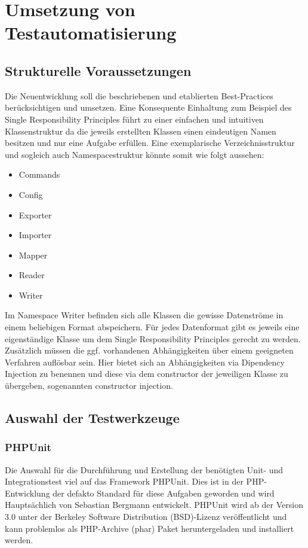 \newpage
\section{Umsetzung von Testautomatisierung}

\subsection{Strukturelle Voraussetzungen}
Die Neuentwicklung soll die beschriebenen und etablierten Best-Practices berücksichtigen und umsetzen. Eine Konsequente Einhaltung zum Beispiel des Single Responsibility Principles führt zu einer einfachen und intuitiven Klassenstruktur da die jeweils erstellten Klassen einen eindeutigen Namen besitzen und nur eine Aufgabe erfüllen. Eine exemplarische Verzeichnisstruktur und sogleich auch Namespacestruktur könnte somit wie folgt aussehen: 

\begin{itemize}
	\item Commands
	\item Config
	\item Exporter
	\item Importer
	\item Mapper
	\item Reader
	\item Writer
\end{itemize}

Im Namespace Writer befinden sich alle Klassen die gewisse Datenströme in einem beliebigen Format abspeichern. Für jedes Datenformat gibt es jeweils eine eigenständige Klasse um dem Single Responsibility Principles gerecht zu werden. Zusätzlich müssen die ggf. vorhandenen Abhängigkeiten über einem geeigneten Verfahren auflösbar sein. Hier bietet sich an Abhängigkeiten via Dipendency Injection zu benennen und diese via dem constructor der jeweiligen Klasse zu übergeben, sogenannten constructor injection.

\subsection{Auswahl der Testwerkzeuge}
\subsubsection{PHPUnit}
Die Auswahl für die Durchführung und Erstellung der benötigten Unit- und Integrationstest viel auf das Framework PHPUnit. Dies ist in der PHP-Entwicklung der defakto Standard für diese Aufgaben geworden und wird Hauptsächlich von Sebastian Bergmann entwickelt. PHPUnit wird ab der Version 3.0 unter der Berkeley Software Distribution (BSD)-Lizenz veröffentlicht und kann problemlos als PHP-Archive (phar) Paket heruntergeladen und installiert werden.

